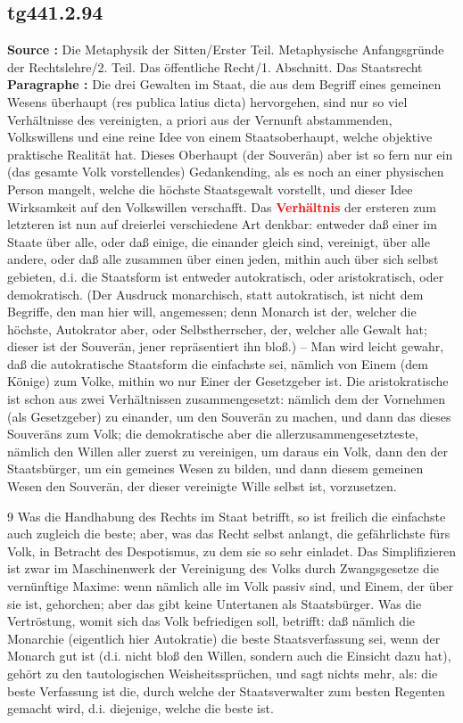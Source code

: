 \documentclass[a4paper,12pt,twoside]{book}
\newcommand{\match}[1]{\textcolor{red}{\textbf{#1}}}
\begin{document}
	\subsection*{tg441.2.94} 
	\textbf{Source : }Die Metaphysik der Sitten/Erster Teil. Metaphysische Anfangsgründe der Rechtslehre/2. Teil. Das öffentliche Recht/1. Abschnitt. Das Staatsrecht\\  
	
	\textbf{Paragraphe : }Die drei Gewalten im Staat, die aus dem Begriff eines gemeinen Wesens überhaupt (res publica latius dicta) hervorgehen, sind nur so viel Verhältnisse des vereinigten, a priori aus der Vernunft abstammenden, Volkswillens und eine reine Idee von einem Staatsoberhaupt, welche objektive praktische Realität hat. Dieses Oberhaupt (der Souverän) aber ist so fern nur ein (das gesamte Volk vorstellendes) Gedankending, als es noch an einer physischen Person mangelt, welche die höchste Staatsgewalt vorstellt, und dieser Idee Wirksamkeit auf den Volkswillen verschafft. Das \match{Verhältnis} der ersteren zum letzteren ist nun auf dreierlei verschiedene Art denkbar: entweder daß einer im Staate über alle, oder daß einige, die einander gleich sind, vereinigt, über alle andere, oder daß alle zusammen über einen jeden, mithin auch über sich selbst gebieten, d.i. die Staatsform ist entweder autokratisch, oder aristokratisch, oder demokratisch. (Der Ausdruck monarchisch, statt autokratisch, ist nicht dem Begriffe, den man hier will, angemessen; denn Monarch ist der, welcher die höchste, Autokrator aber, oder Selbstherrscher,  der, welcher alle Gewalt hat; dieser ist der Souverän, jener repräsentiert ihn bloß.) – Man wird leicht gewahr, daß die autokratische Staatsform die einfachste sei, nämlich von Einem (dem Könige) zum Volke, mithin wo nur Einer der Gesetzgeber ist. Die aristokratische ist schon aus zwei Verhältnissen zusammengesetzt: nämlich dem der Vornehmen (als Gesetzgeber) zu einander, um den Souverän zu machen, und dann das dieses Souveräns zum Volk; die demokratische aber die allerzusammengesetzteste, nämlich den Willen aller zuerst zu vereinigen, um daraus ein Volk, dann den der Staatsbürger, um ein gemeines Wesen zu bilden, und dann diesem gemeinen Wesen den Souverän, der dieser vereinigte Wille selbst ist, vorzusetzen.
	
	
	9
	Was die Handhabung des Rechts im Staat betrifft, so ist freilich die einfachste auch zugleich die beste; aber, was das Recht selbst anlangt, die gefährlichste fürs Volk, in Betracht des Despotismus, zu dem sie so sehr einladet. Das Simplifizieren ist zwar im Maschinenwerk der Vereinigung des Volks durch Zwangsgesetze die vernünftige Maxime: wenn nämlich alle im Volk passiv sind, und Einem, der über sie ist, gehorchen; aber das gibt keine Untertanen als Staatsbürger. Was die Vertröstung, womit sich das Volk befriedigen soll, betrifft: daß nämlich die Monarchie (eigentlich hier Autokratie) die beste Staatsverfassung sei, wenn der Monarch gut ist (d.i. nicht bloß den Willen, sondern auch die Einsicht dazu hat), gehört zu den tautologischen Weisheitssprüchen, und sagt nichts mehr, als: die beste Verfassung ist die, durch welche der Staatsverwalter zum besten Regenten gemacht wird, d.i. diejenige, welche die beste ist. 
	
\end{document}
